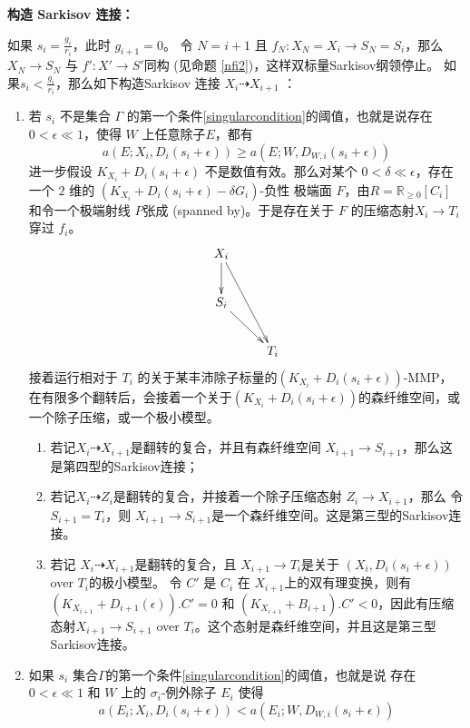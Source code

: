 \textbf{构造 Sarkisov 连接：}\label{Construction}

如果 $s_{i}=\frac{g_{i}}{r_{i}}$，此时 $g_{i+1}=0$。 令 $N=i+1$  且 $f_{N}:X_{N}=X_{i} \to S_{N}=S_{i}$，那么  $X_{N}\to S_{N}$ 与 $f':X'\to S'$同构 (见命题 \ref{nfi2})，这样双标量Sarkisov纲领停止。 如果$s_{i}<\frac{g_{i}}{r_{i}}$，那么如下构造Sarkisov 连接 $X_{i}\dashrightarrow X_{i+1}$ ：
\begin{enumerate}
  \item\label{2a} 若 $s_{i}$ 不是集合 $\Gamma$ 的第一个条件\ref{singularcondition}的阈值，也就是说存在 $0<\epsilon\ll 1$，使得 $W$ 上任意除子$E$，都有
  \[
    a(E;X_{i},D_{i}(s_{i}+\epsilon))\geqslant a(E;W,D_{W,i}(s_{i}+\epsilon))
  \]
  进一步假设 $K_{X_{i}}+D_{i}(s_{i}+\epsilon)$ 不是数值有效。那么对某个 $0< \delta \ll \epsilon $，存在一个 $2$ 维的 $(K_{X_{i}}+D_{i}(s_{i}+\epsilon)-\delta G_{i})$-负性 极端面 $F$，由$R=\mathbb{R}_{\geqslant 0}[C_{i}]$ 和令一个极端射线  $P$张成 (spanned by)。于是存在关于 $F$   的压缩态射$X_{i}\to T_{i}$穿过 $f_{i}$。 
  \[
    \xymatrix{
      X_{i}\ar[d]\ar[rdd]& \\
      S_{i}\ar[rd]&\\
         &T_{i}
    }
  \]
  接着运行相对于 $T_{i}$ 的关于某丰沛除子标量的$(K_{X_{i}}+D_{i}(s_{i}+\epsilon))$-MMP，在有限多个翻转后，会接着一个关于$(K_{X_{i}}+D_{i}(s_{i}+\epsilon))$的森纤维空间，或一个除子压缩，或一个极小模型。
  \begin{enumerate}
    \item  若记$X_{i}\dashrightarrow X_{i+1}$是翻转的复合，并且有森纤维空间 $X_{i+1}\to S_{i+1}$，那么这是第四型的Sarkisov连接；
    \item 若记$X_{i}\dashrightarrow Z_{i}$是翻转的复合，并接着一个除子压缩态射 $Z_{i}\to X_{i+1}$，那么 令 $S_{i+1}=T_{i}$，则 $X_{i+1}\to S_{i+1}$是一个森纤维空间。这是第三型的Sarkisov连接。
    \item 若记 $X_{i}\dashrightarrow X_{i+1}$是翻转的复合，且 $X_{i+1}\to T_{i}$是关于 $\left(X_{i},D_{i}\left(s_{i}+\epsilon\right)\right)$ over $T_{i}$的极小模型。 令  $C'$ 是  $C_{i}$ 在 $X_{i+1}$上的双有理变换，则有 $(K_{X_{i+1}}+D_{i+1}(\epsilon)).C'=0$ 和 $(K_{X_{i+1}}+B_{i+1}).C'<0$，因此有压缩态射$X_{i+1} \to S_{i+1}$ over $T_i$。这个态射是森纤维空间，并且这是第三型Sarkisov连接。
  \end{enumerate}
    \item 如果 $s_{i}$ 集合$\Gamma$的第一个条件\ref{singularcondition}的阈值，也就是说 存在  $0<\epsilon \ll 1$ 和 $W$ 上的  $\sigma_{i}$-例外除子 $E_{i}$ 使得
  \[ a(E_{i};X_{i},D_{i}(s_{i}+\epsilon))< a(E_{i};W,D_{W,i}(s_{i}+\epsilon)) \]

\end{enumerate}

